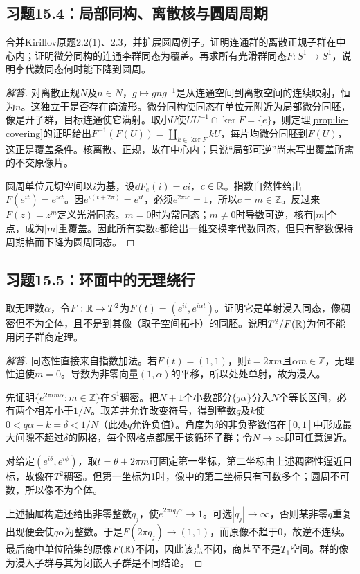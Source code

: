 \subsection*{习题15.4：局部同构、离散核与圆周周期}
合并Kirillov原题2.2(1)、2.3，并扩展圆周例子。证明连通群的离散正规子群在中心内；证明微分同构的连通李群同态为覆盖。再求所有光滑群同态$F:S^1\to S^1$，说明李代数同态何时能下降到圆周。
\begin{proof}[解答]
对离散正规$N$及$n\in N$，$g\mapsto gng^{-1}$是从连通空间到离散空间的连续映射，恒为$n$。这独立于是否存在商流形。微分同构使同态在单位元附近为局部微分同胚，像是开子群，目标连通使它满射。取小$U$使$UU^{-1}\cap\ker F=\{e\}$，则定理\ref{prop:lie-covering}的证明给出$F^{-1}(F(U))=\coprod_{k\in\ker F}kU$，每片均微分同胚到$F(U)$，这正是覆盖条件。核离散、正规，故在中心内；只说“局部可逆”尚未写出覆盖所需的不交原像片。

圆周单位元切空间以$i$为基，设$\dd F_e(i)=ci$，$c\in\mathbb{R}$。指数自然性给出$F(e^{it})=e^{ict}$。因$e^{i(t+2\pi)}=e^{it}$，必须$e^{2\pi ic}=1$，所以$c=m\in\mathbb Z$。反过来$F(z)=z^m$定义光滑同态。$m=0$时为常同态；$m\ne0$时导数可逆，核有$|m|$个点，成为$|m|$重覆盖。因此所有实数$c$都给出一维交换李代数同态，但只有整数保持周期格而下降为圆周同态。
\end{proof}

\subsection*{习题15.5：环面中的无理绕行}
取无理数$\alpha$，令$F:\mathbb{R}\to T^2$为$F(t)=(e^{it},e^{i\alpha t})$。证明它是单射浸入同态，像稠密但不为全体，且不是到其像（取子空间拓扑）的同胚。说明$T^2/F(\mathbb{R})$为何不能用闭子群商定理。
\begin{proof}[解答]
同态性直接来自指数加法。若$F(t)=(1,1)$，则$t=2\pi m$且$\alpha m\in\mathbb Z$，无理性迫使$m=0$。导数为非零向量$(1,\alpha)$的平移，所以处处单射，故为浸入。

先证明$\{e^{2\pi i m\alpha}:m\in\mathbb Z\}$在$S^1$稠密。把$N+1$个小数部分$\{j\alpha\}$分入$N$个等长区间，必有两个相差小于$1/N$。取差并允许改变符号，得到整数$q$及$k$使$0<q\alpha-k=\delta<1/N$（此处$q$允许负值）。角度为$\delta$的非负整数倍在$[0,1]$中形成最大间隙不超过$\delta$的网格，每个网格点都属于该循环子群；令$N\to\infty$即可任意逼近。

对给定$(e^{i\theta},e^{i\phi})$，取$t=\theta+2\pi m$可固定第一坐标，第二坐标由上述稠密性逼近目标，故像在$T^2$稠密。但第一坐标为1时，像中的第二坐标只有可数多个；圆周不可数，所以像不为全体。

上述抽屉构造还给出非零整数$q_j$，使$e^{2\pi iq_j\alpha}\to1$。可选$|q_j|\to\infty$，否则某非零$q$重复出现便会使$q\alpha$为整数。于是$F(2\pi q_j)\to(1,1)$，而原像不趋于0，故逆不连续。最后商中单位陪集的原像$F(\mathbb{R})$不闭，因此该点不闭，商甚至不是$T_1$空间。群的像为浸入子群与其为闭嵌入子群是不同结论。
\end{proof}

